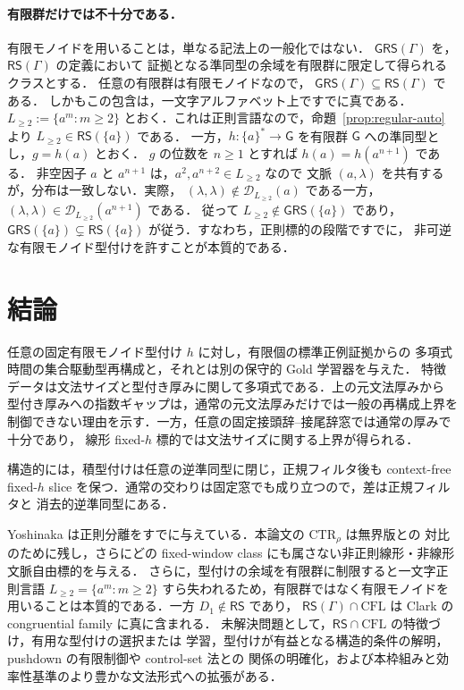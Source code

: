 \documentclass[11pt,a4paper]{ltjsarticle}
\theoremstyle{remark}
\theoremstyle{plain}
\newcommand{\D}{\mathcal{D}}
\begin{document}
\paragraph{有限群だけでは不十分である．}
有限モノイドを用いることは，単なる記法上の一般化ではない．
$\mathsf{GRS}(\Gamma)$ を，$\mathsf{RS}(\Gamma)$ の定義において
証拠となる準同型の余域を有限群に限定して得られるクラスとする．
任意の有限群は有限モノイドなので，
$\mathsf{GRS}(\Gamma)\subseteq\mathsf{RS}(\Gamma)$ である．
しかもこの包含は，一文字アルファベット上ですでに真である．
$L_{\ge2}:=\{a^m:m\ge2\}$
とおく．これは正則言語なので，命題~\ref{prop:regular-auto} より
$L_{\ge2}\in\mathsf{RS}(\{a\})$ である．
一方，$h:\{a\}^*\to\mathsf G$ を有限群 $\mathsf G$ への準同型とし，$g=h(a)$ とおく．
$g$ の位数を $n\ge1$ とすれば
$h(a)=h(a^{n+1})$ である．
非空因子 $a$ と $a^{n+1}$ は，$a^2,a^{n+2}\in L_{\ge2}$ なので
文脈 $(a,\lambda)$ を共有するが，分布は一致しない．実際，
$(\lambda,\lambda)\notin\D_{L_{\ge2}}(a)$ である一方，
$(\lambda,\lambda)\in\D_{L_{\ge2}}(a^{n+1})$ である．
従って $L_{\ge2}\notin\mathsf{GRS}(\{a\})$ であり，
$\mathsf{GRS}(\{a\})\subsetneq\mathsf{RS}(\{a\})$
が従う．すなわち，正則標的の段階ですでに，
非可逆な有限モノイド型付けを許すことが本質的である．

\section{結論}

任意の固定有限モノイド型付け $h$ に対し，有限個の標準正例証拠からの
多項式時間の集合駆動型再構成と，それとは別の保守的 Gold 学習器を与えた．
特徴データは文法サイズと型付き厚みに関して多項式である．上の元文法厚みから
型付き厚みへの指数ギャップは，通常の元文法厚みだけでは一般の再構成上界を
制御できない理由を示す．一方，任意の固定接頭辞--接尾辞窓では通常の厚みで十分であり，
線形 fixed-$h$ 標的では文法サイズに関する上界が得られる．

構造的には，積型付けは任意の逆準同型に閉じ，正規フィルタ後も context-free
fixed-$h$ slice を保つ．通常の交わりは固定窓でも成り立つので，差は正規フィルタと
消去的逆準同型にある．

Yoshinaka は正則分離をすでに与えている．本論文の $\mathrm{CTR}_\rho$ は無界版との
対比のために残し，さらにどの fixed-window class にも属さない非正則線形・非線形
文脈自由標的を与える．
さらに，型付けの余域を有限群に制限すると一文字正則言語
$L_{\ge2}=\{a^m:m\ge2\}$ すら失われるため，有限群ではなく有限モノイドを
用いることは本質的である．一方 $D_1\notin\mathsf{RS}$ であり，
$\mathsf{RS}(\Gamma)\cap\mathrm{CFL}$ は Clark の congruential family に真に含まれる．
未解決問題として，$\mathsf{RS}\cap\mathrm{CFL}$ の特徴づけ，有用な型付けの選択または
学習，型付けが有益となる構造的条件の解明，pushdown の有限制御や control-set 法との
関係の明確化，および本枠組みと効率性基準のより豊かな文法形式への拡張がある．
\end{document}
